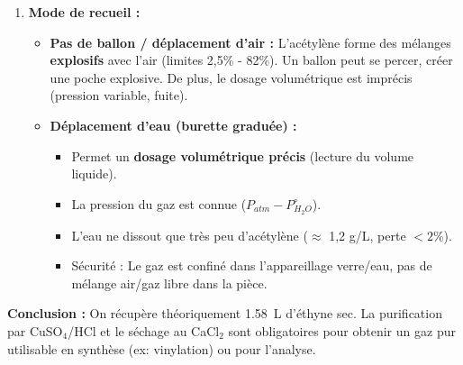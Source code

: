\documentclass[11pt]{article}
\begin{document}
\begin{exoresolu}
\begin{enumerate}
    \item \textbf{Mode de recueil :}
    \begin{itemize}
        \item \textbf{Pas de ballon / déplacement d'air :} L'acétylène forme des mélanges \textbf{explosifs} avec l'air (limites 2,5\% - 82\%). Un ballon peut se percer, créer une poche explosive. De plus, le dosage volumétrique est imprécis (pression variable, fuite).
        \item \textbf{Déplacement d'eau (burette graduée) :} 
            \begin{itemize}
                \item Permet un \textbf{dosage volumétrique précis} (lecture du volume liquide).
                \item La pression du gaz est connue ($P_{atm} - P_{H_2O}^\circ$).
                \item L'eau ne dissout que très peu d'acétylène ($\approx$ 1,2 g/L, perte $< 2\%$).
                \item Sécurité : Le gaz est confiné dans l'appareillage verre/eau, pas de mélange air/gaz libre dans la pièce.
            \end{itemize}
    \end{itemize}
\end{enumerate}
\textbf{Conclusion :} On récupère théoriquement \SI{1,58}{L} d'éthyne sec. La purification par CuSO$_4$/HCl et le séchage au CaCl$_2$ sont obligatoires pour obtenir un gaz pur utilisable en synthèse (ex: vinylation) ou pour l'analyse.
\end{exoresolu}
\end{document}
